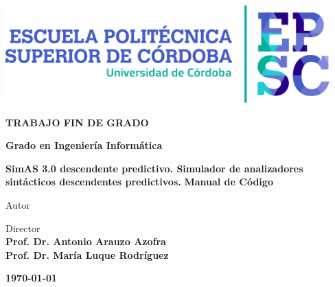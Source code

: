 \documentclass[a4paper,12pt,twoside,final]{book}
\begin{document}
\renewcommand*\listtablename{Índice de tablas}
\renewcommand{\tablename}{Tabla}
\begin{center}
\fontfamily{\sfdefault}\selectfont
\vspace*{2cm}

\vfill
\vfill
\includegraphics[width=12.5cm]{UCO/LogotipoEPSC.pdf}
\vfill
\vfill

\large\textbf{\color{epsc:medio}
  TRABAJO FIN DE GRADO
}
\vfill

\Large\textbf{\color{epsc:verde}
  Grado en Ingeniería Informática
}
\vfill
\vfill

\Huge\textbf{\color{epsc:oscuro}
  SimAS 3.0 descendente predictivo. Simulador de analizadores sintácticos descendentes predictivos.
}
\vfill
\vfill
\Large\textbf{\color{epsc:verde}
  Manual de Código
}
\vfill
\vfill


\large{\color{epsc:oscuro}Autor}\\
\textbf{\color{epsc:medio}{D. Antonio Llamas García }}
\vfill

\large{\color{epsc:oscuro} Director }\\
\textbf{\color{epsc:medio} Prof. Dr. Antonio Arauzo Azofra}\\
\textbf{\color{epsc:medio} Prof. Dr. María Luque Rodríguez}
\vfill



\textbf{\color{epsc:verde} \monthyeardate\today}
\vfill
\vfill
\vspace{2.7cm}
\end{center}


\thispagestyle{empty}
\pagecolor{white}
\vspace*{2cm}


\cleardoublepage
\setcounter{page}{1}
\setcounter{tocdepth}{3} %
\setcounter{secnumdepth}{3} %
\tableofcontents
\listoffigures

\afterpage{\null\newpage}
\thispagestyle{empty}
\newpage
\mainmatter
\end{document}
